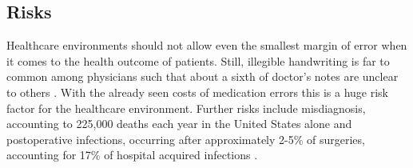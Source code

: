 \subsection{Risks}
Healthcare environments should not allow even the smallest margin of error when it comes to the health outcome of patients. Still, illegible handwriting is far to common among physicians such that about a sixth of doctor's notes are unclear to others \cite{rodriguez2002illegible}. With the already seen costs of medication errors this is a huge risk factor for the healthcare environment. Further risks include misdiagnosis, accounting to 225,000 deaths each year in the United States alone \cite{gregerIatrogenic} and postoperative infections, occurring after approximately 2-5\% of surgeries, accounting for 17\% of hospital acquired infections \cite{andreu2015wearable}.

